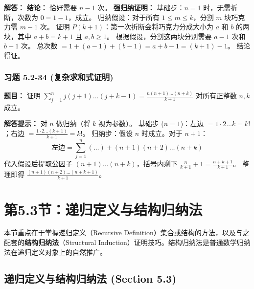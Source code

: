 \documentclass[11pt,UTF8]{article}
\begin{document}
\textbf{解答：} 
\textbf{结论：} 恰好需要 $n-1$ 次。
\textbf{强归纳证明：}
基础步：$n=1$ 时，无需折断，次数为 $0 = 1-1$，成立。
归纳假设：对于所有 $1 \le m \le k$，分割 $m$ 块巧克力需 $m-1$ 次。
证明 $P(k+1)$：第一次折断会将巧克力分成大小为 $a$ 和 $b$ 的两块，其中 $a+b = k+1$ 且 $a,b \ge 1$。
根据假设，分割这两块分别需要 $a-1$ 次和 $b-1$ 次。
总次数 $= 1 + (a-1) + (b-1) = a+b-1 = (k+1)-1$。
结论得证。

\subsubsection*{习题 5.2-34 (复杂求和式证明)}
\textbf{题目：} 证明 $\sum_{j=1}^{n} j(j+1)\dots(j+k-1) = \frac{n(n+1)\dots(n+k)}{k+1}$ 对所有正整数 $n, k$ 成立。

\textbf{解答提示：} 对 $n$ 做归纳（将 $k$ 视为参数）。
基础步 ($n=1$)：左边 $= 1\cdot 2\dots k = k!$；右边 $= \frac{1\cdot 2\dots(k+1)}{k+1} = k!$。
归纳步：假设 $n$ 时成立。对于 $n+1$：
\[ \text{左边} = \sum_{j=1}^{n} (\dots) + (n+1)(n+2)\dots(n+k) \]
代入假设后提取公因子 $(n+1)\dots(n+k)$，括号内剩下 $\frac{n}{k+1} + 1 = \frac{n+k+1}{k+1}$。
整理即得 $\frac{(n+1)(n+2)\dots(n+k+1)}{k+1}$。



\section{第5.3节：递归定义与结构归纳法}

本节重点在于掌握递归定义（Recursive Definition）集合或结构的方法，以及与之配套的\textbf{结构归纳法}（Structural Induction）证明技巧。结构归纳法是普通数学归纳法在递归定义对象上的自然推广。

\subsection{递归定义与结构归纳法 (Section 5.3)}
\end{document}
